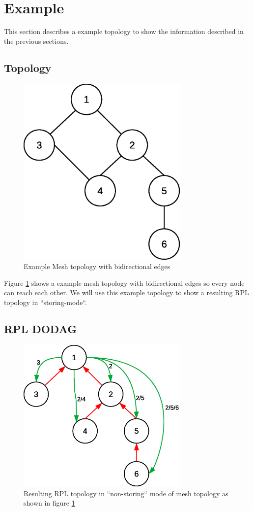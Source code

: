 \documentclass[letterpaper]{article}
\begin{document}
\section{Example}

This section describes a example topology to show the information described in the previous sections.

\subsection{Topology}

\begin{figure}[h]
	\includegraphics[width=3.31in]{figs/mesh0.eps}
	\caption{Example Mesh topology with bidirectional edges}
	\label{mesh0}
\end{figure}

Figure \ref{mesh0} shows a example mesh topology with bidirectional edges so every node can reach each other.
We will use this example topology to show a resulting RPL topology in ``storing-mode``.

\subsection{RPL DODAG}

\begin{figure}[h]
	\includegraphics[width=3.31in]{figs/mesh1.eps}
	\caption{Resulting RPL topology in ``non-storing`` mode of mesh topology as shown in figure \ref{mesh0}}
	\label{mesh1}
\end{figure}
\end{document}
